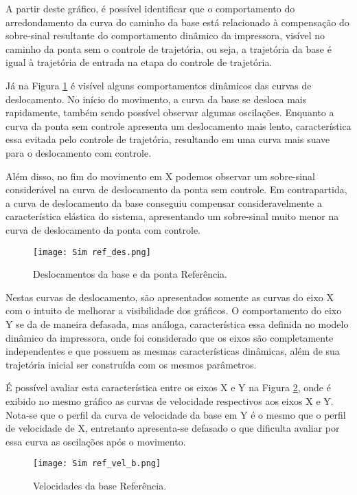 A partir deste gráfico, é possível identificar que o comportamento do arredondamento da curva do caminho da base está relacionado à compensação do sobre-sinal resultante do comportamento dinâmico da impressora, visível no caminho da ponta sem o controle de trajetória, ou seja, a trajetória da base é igual à trajetória de entrada na etapa do controle de trajetória.

Já na Figura \ref{fig:ref_des} é visível alguns comportamentos dinâmicos das curvas de deslocamento. No início do movimento, a curva da base se desloca mais rapidamente, também sendo possível observar algumas oscilações. Enquanto a curva da ponta sem controle apresenta um deslocamento mais lento, característica essa evitada pelo controle de trajetória, resultando em uma curva mais suave para o deslocamento com controle.

Além disso, no fim do movimento em X podemos observar um sobre-sinal considerável na curva de deslocamento da ponta sem controle. Em contrapartida, a curva de deslocamento da base conseguiu compensar consideravelmente a característica elástica do sistema, apresentando um sobre-sinal muito menor na curva de deslocamento da ponta com controle.

\begin{figure}[H]
    \centering
    \caption{Deslocamentos da base e da ponta Referência.}
    \texttt{[image: Sim ref\_des.png]}

    \label{fig:ref_des}
\end{figure}

Nestas curvas de deslocamento, são apresentados somente as curvas do eixo X com o intuito de melhorar a visibilidade dos gráficos. O comportamento do eixo Y se da de maneira defasada, mas análoga, característica essa definida no modelo dinâmico da impressora, onde foi considerado que os eixos são completamente independentes e que possuem as mesmas características dinâmicas, além de sua trajetória inicial ser construída com os mesmos parâmetros.

É possível avaliar esta característica entre os eixos X e Y na Figura \ref{fig:ref_vel_b}, onde é exibido no mesmo gráfico as curvas de velocidade respectivos aos eixos X e Y. Nota-se que o perfil da curva de velocidade da base em Y é o mesmo que o perfil de velocidade de X, entretanto apresenta-se defasado o que dificulta avaliar por essa curva as oscilações após o movimento.

\begin{figure}[H]
    \centering
    \caption{Velocidades da base Referência.}
    \texttt{[image: Sim ref\_vel\_b.png]}

    \label{fig:ref_vel_b}
\end{figure}


